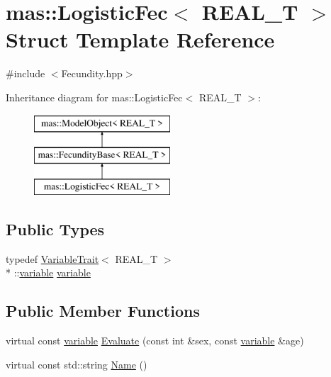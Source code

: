 \hypertarget{structmas_1_1_logistic_fec}{\section{mas\-:\-:Logistic\-Fec$<$ R\-E\-A\-L\-\_\-\-T $>$ Struct Template Reference}
\label{structmas_1_1_logistic_fec}
}


{\ttfamily \#include $<$Fecundity.\-hpp$>$}

Inheritance diagram for mas\-:\-:Logistic\-Fec$<$ R\-E\-A\-L\-\_\-\-T $>$\-:\begin{figure}[H]
\begin{center}
\leavevmode
\includegraphics[height=3.000000cm]{structmas_1_1_logistic_fec}
\end{center}
\end{figure}
\subsection*{Public Types}
\begin{DoxyCompactItemize}
\item 
typedef \hyperlink{structmas_1_1_variable_trait}{Variable\-Trait}$<$ R\-E\-A\-L\-\_\-\-T $>$\\*
\-::\hyperlink{structmas_1_1_logistic_fec_ad7f5125508249b28ef04b00d022d8055}{variable} \hyperlink{structmas_1_1_logistic_fec_ad7f5125508249b28ef04b00d022d8055}{variable}
\end{DoxyCompactItemize}
\subsection*{Public Member Functions}
\begin{DoxyCompactItemize}
\item 
virtual const \hyperlink{structmas_1_1_logistic_fec_ad7f5125508249b28ef04b00d022d8055}{variable} \hyperlink{structmas_1_1_logistic_fec_a39ba0a3a580b10ec1cf5ad2e3d24a029}{Evaluate} (const int \&sex, const \hyperlink{structmas_1_1_logistic_fec_ad7f5125508249b28ef04b00d022d8055}{variable} \&age)
\item 
virtual const std\-::string \hyperlink{structmas_1_1_logistic_fec_a2c6a92c26528208819f69dabc1859956}{Name} ()
\end{DoxyCompactItemize}
